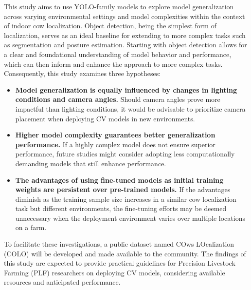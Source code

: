 This study aims to use YOLO-family models to explore model generalization across varying environmental settings and model complexities within the context of indoor cow localization. Object detection, being the simplest form of localization, serves as an ideal baseline for extending to more complex tasks such as segmentation and posture estimation. Starting with object detection allows for a clear and foundational understanding of model behavior and performance, which can then inform and enhance the approach to more complex tasks. Consequently, this study examines three hypotheses:

\begin{itemize}
    \item \textbf{Model generalization is equally influenced by changes in lighting conditions and camera angles.} Should camera angles prove more impactful than lighting conditions, it would be advisable to prioritize camera placement when deploying CV models in new environments.
    \item \textbf{Higher model complexity guarantees better generalization performance.} If a highly complex model does not ensure superior performance, future studies might consider adopting less computationally demanding models that still enhance performance.
    \item \textbf{The advantages of using fine-tuned models as initial training weights are persistent over pre-trained models.} If the advantages diminish as the training sample size increases in a similar cow localization task but different environments, the fine-tuning efforts may be deemed unnecessary when the deployment environment varies over multiple locations on a farm.
\end{itemize}

To facilitate these investigations, a public dataset named COws LOcalization (COLO) \cite{COLODataset2023} will be developed and made available to the community. The findings of this study are expected to provide practical guidelines for Precision Livestock Farming (PLF) researchers on deploying CV models, considering available resources and anticipated performance.